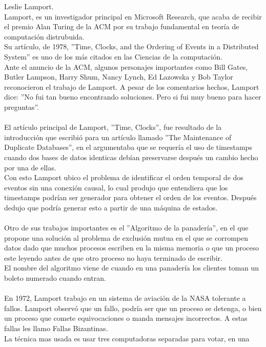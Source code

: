 \documentclass{article}
\begin{document}
\begin{enumerate}
{    Leslie Lamport.\\
    Lamport, es un investigador principal en Microsoft Research, que acaba de
    recibir el premio Alan Turing de la ACM por su trabajo fundamental en teoría
    de computación distrubuida.\\
    Su artículo, de 1978, ''Time, Clocks, and the Ordering of Events in a
    Distributed System'' es uno de los más citados en las Ciencias de la computación.\\
    Ante el anuncio de la ACM, algunos personajes importantes como Bill 
    Gates, Butler Lampson, Harry Shum, Nancy Lynch, Ed Lazowska y Bob Taylor
    reconocieron el trabajo de Lamport.
    A pesar de los comentarios hechos, Lamport dice: ''No fui tan bueno encontrando
    soluciones. Pero si fui muy bueno para hacer preguntas''.\\\\
    El artículo principal de Lamport, ''Time, Clocks'', fue resultado de la
    introducción que escribió para un artículo llamado ''The Maintenance of Duplicate
    Databases'', en el argumentaba que se requería el uso de timestamps cuando dos 
    bases de datos identicas debían preservarse después un cambio hecho por una de
    ellas.\\
    Con esto Lamport ubico el problema de identificar el orden temporal de dos eventos 
    sin una conexión causal, lo cual produjo que entendiera que los timestamps podrían
    ser generador para obtener el orden de los eventos. Después dedujo que podría
    generar esto a partir de una máquina de estados.\\\\
    Otro de sus trabajos importantes es el ''Algoritmo de la panadería'', en el que
    propone una solución al problema de exclusión mutua en el que se corrompen datos
    dado que muchos procesos escriben en la misma memoria o que un proceso este leyendo
    antes de que otro proceso no haya terminado de escribir.\\
    El nombre del algoritmo viene de cuando en una panadería los clientes toman un
    boleto numerado cuando entran.\\\\
    En 1972, Lamport trabajo en un sistema de aviación de la NASA tolerante a fallos.
    Lamport observó que un fallo, podría ser que un proceso se detenga, o bien un
    proceso que comete equivocaciones o manda mensajes incorrectos. A estas fallas
    les llamo Fallas Bizantinas.\\
    La técnica mas usada es usar tres computadoras separadas para votar, en una
}
\end{enumerate}
\end{document}
